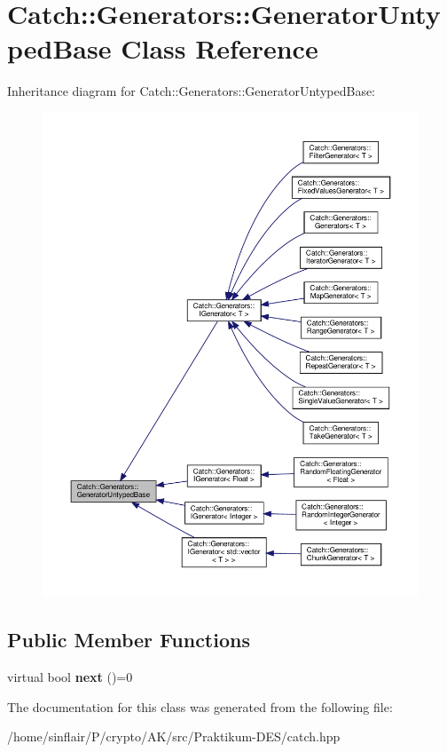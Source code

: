\hypertarget{classCatch_1_1Generators_1_1GeneratorUntypedBase}{}\section{Catch\+:\+:Generators\+:\+:Generator\+Untyped\+Base Class Reference}
\label{classCatch_1_1Generators_1_1GeneratorUntypedBase}


Inheritance diagram for Catch\+:\+:Generators\+:\+:Generator\+Untyped\+Base\+:
\nopagebreak
\begin{figure}[H]
\begin{center}
\leavevmode
\includegraphics[width=350pt]{classCatch_1_1Generators_1_1GeneratorUntypedBase__inherit__graph}
\end{center}
\end{figure}
\subsection*{Public Member Functions}
\begin{DoxyCompactItemize}
\item 
\mbox{\label{classCatch_1_1Generators_1_1GeneratorUntypedBase_aeed3c0cd6233c5f553549e453b8d6638}} 
virtual bool {\bfseries next} ()=0
\end{DoxyCompactItemize}


The documentation for this class was generated from the following file\+:\begin{DoxyCompactItemize}
\item 
/home/sinflair/\+P/crypto/\+A\+K/src/\+Praktikum-\/\+D\+E\+S/catch.\+hpp\end{DoxyCompactItemize}
